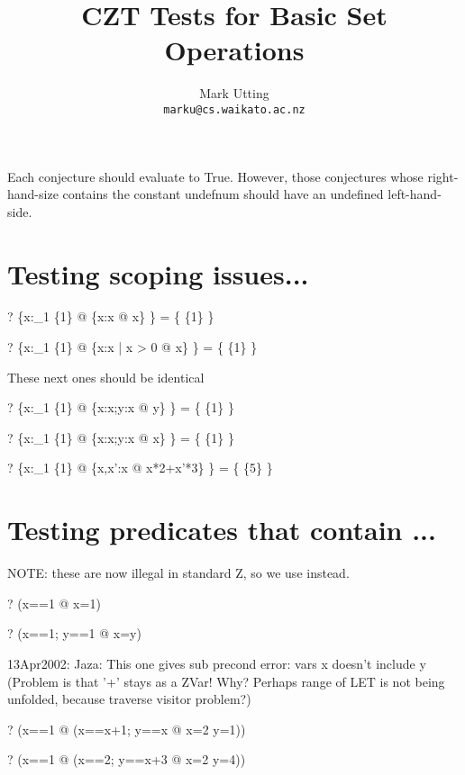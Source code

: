 \documentclass{article}
\title{CZT Tests for Basic Set Operations}
\author{Mark Utting \\ \texttt{marku@cs.waikato.ac.nz}}
\begin{document}
\maketitle

Each conjecture should evaluate to True.
However, those conjectures whose right-hand-size contains
the constant undefnum should have an undefined left-hand-side.


\section{Testing scoping issues...}

\begin{zed} \vdash? \{x:\power_1 \{1\} @ \{x:x @ x\} \} = \{ \{1\} \} \end{zed}
\begin{zed} \vdash? \{x:\power_1 \{1\} @ \{x:x | x > 0 @ x\} \} = \{ \{1\} \} \end{zed}

 These next ones should be identical
\begin{zed} \vdash? \{x:\power_1 \{1\} @ \{x:x;y:x @ y\} \} = \{ \{1\} \} \end{zed}
\begin{zed} \vdash? \{x:\power_1 \{1\} @ \{x:x;y:x @ x\} \} = \{ \{1\} \} \end{zed}

\begin{zed} \vdash? \{x:\power_1 \{1\} @ \{x,x':x @ x*2+x'*3\} \} = \{ \{5\} \} \end{zed}


\section{Testing predicates that contain \LET...}
NOTE: these are now illegal in standard Z, so we use \exists instead.
\begin{zed} \vdash? (\exists x==1 @ x=1) \end{zed}
\begin{zed} \vdash? (\exists x==1; y==1 @ x=y) \end{zed}

 13Apr2002: Jaza: This one gives sub precond error: vars {x} doesn't include y
 (Problem is that '+' stays as a ZVar!  Why?  Perhaps range of LET
  is not being unfolded, because traverse visitor problem?)
\begin{zed} \vdash? 
   (\exists x==1 @ (\exists x==x+1; y==x @ x=2 \land y=1)) 
\end{zed}
\begin{zed} \vdash? 
   (\exists x==1 @ (\exists x==2; y==x+3 @ x=2 \land y=4))
\end{zed}
\end{document}
